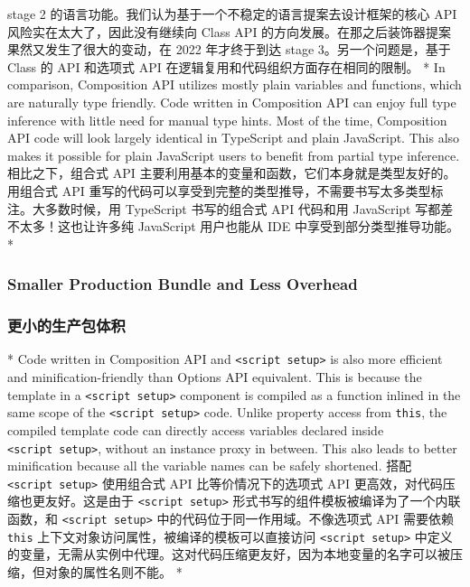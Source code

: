 \begin{paracol}{2}
stage 2 的语言功能。我们认为基于一个不稳定的语言提案去设计框架的核心 API
风险实在太大了，因此没有继续向 Class API
的方向发展。在那之后装饰器提案果然又发生了很大的变动，在 2022
年才终于到达 stage 3。另一个问题是，基于 Class 的 API 和选项式 API
在逻辑复用和代码组织方面存在相同的限制。
\switchcolumn[0]*%
In comparison, Composition API utilizes mostly plain variables and
functions, which are naturally type friendly. Code written in
Composition API can enjoy full type inference with little need for
manual type hints. Most of the time, Composition API code will look
largely identical in TypeScript and plain JavaScript. This also makes it
possible for plain JavaScript users to benefit from partial type
inference.
\switchcolumn
相比之下，组合式 API
主要利用基本的变量和函数，它们本身就是类型友好的。用组合式 API
重写的代码可以享受到完整的类型推导，不需要书写太多类型标注。大多数时候，用
TypeScript 书写的组合式 API 代码和用 JavaScript
写都差不太多！这也让许多纯 JavaScript 用户也能从 IDE
中享受到部分类型推导功能。
\switchcolumn[0]*%
\subsubsection{Smaller Production Bundle and Less Overhead}
\switchcolumn
\subsubsection{更小的生产包体积}
\switchcolumn[0]*%
Code written in Composition API and
\texttt{\textless{}script\ setup\textgreater{}} is also more efficient
and minification-friendly than Options API equivalent. This is because
the template in a \texttt{\textless{}script\ setup\textgreater{}}
component is compiled as a function inlined in the same scope of the
\texttt{\textless{}script\ setup\textgreater{}} code. Unlike property
access from \texttt{this}, the compiled template code can directly
access variables declared inside
\texttt{\textless{}script\ setup\textgreater{}}, without an instance
proxy in between. This also leads to better minification because all the
variable names can be safely shortened.
\switchcolumn
搭配 \texttt{\textless{}script\ setup\textgreater{}} 使用组合式 API
比等价情况下的选项式 API 更高效，对代码压缩也更友好。这是由于
\texttt{\textless{}script\ setup\textgreater{}}
形式书写的组件模板被编译为了一个内联函数，和
\texttt{\textless{}script\ setup\textgreater{}}
中的代码位于同一作用域。不像选项式 API 需要依赖 \texttt{this}
上下文对象访问属性，被编译的模板可以直接访问
\texttt{\textless{}script\ setup\textgreater{}}
中定义的变量，无需从实例中代理。这对代码压缩更友好，因为本地变量的名字可以被压缩，但对象的属性名则不能。
\switchcolumn[0]*%

\end{paracol}
